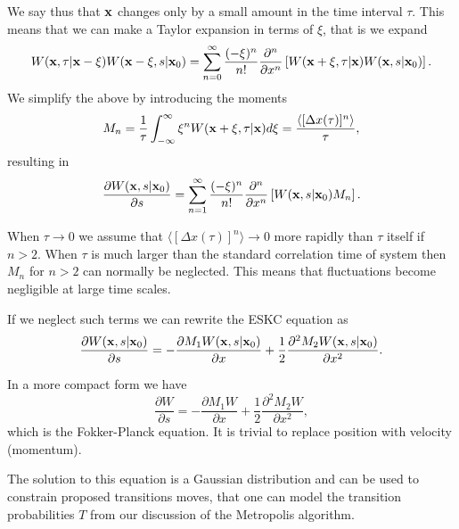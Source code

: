 We say thus that ${\bf x}$ changes only by a small amount in the time interval $\tau$. 
This means that we can make a Taylor expansion in terms of $\xi$, that is we
expand
\[
W({\bf x},\tau|{\bf x}-\xi)W({\bf x}-\xi,s|{\bf x}_0) =
\sum_{n=0}^{\infty}\frac{(-\xi)^n}{n!}\frac{\partial^n}{\partial x^n}\left[W({\bf x}+\xi,\tau|{\bf x})W({\bf x},s|{\bf x}_0)
\right].
\]
We simplify the above by introducing the moments 
\[
M_n=\frac{1}{\tau}\int_{-\infty}^{\infty} \xi^nW({\bf x}+\xi,\tau|{\bf x})d\xi=
\frac{\langle [\Delta x(\tau)]^n\rangle}{\tau},
\]
resulting in
\[
\frac{\partial W({\bf x},s|{\bf x}_0)}{\partial s}=
\sum_{n=1}^{\infty}\frac{(-\xi)^n}{n!}\frac{\partial^n}{\partial x^n}
\left[W({\bf x},s|{\bf x}_0)M_n\right].
\]

When $\tau \rightarrow 0$ we assume that $\langle [\Delta x(\tau)]^n\rangle \rightarrow 0$ more rapidly than $\tau$ itself if $n > 2$. 
When $\tau$ is much larger than the standard correlation time of 
system then $M_n$ for $n > 2$ can normally be neglected.
This means that fluctuations become negligible at large time scales.

If we neglect such terms we can rewrite the ESKC equation as 
\[
\frac{\partial W({\bf x},s|{\bf x}_0)}{\partial s}=
-\frac{\partial M_1W({\bf x},s|{\bf x}_0)}{\partial x}+
\frac{1}{2}\frac{\partial^2 M_2W({\bf x},s|{\bf x}_0)}{\partial x^2}.
\]

In a more compact form we have
\[
\frac{\partial W}{\partial s}=
-\frac{\partial M_1W}{\partial x}+
\frac{1}{2}\frac{\partial^2 M_2W}{\partial x^2},
\]
which is the Fokker-Planck equation.  It is trivial to replace 
position with velocity (momentum).

The solution to this equation is a Gaussian distribution and can be used to constrain proposed transitions moves, that one can model the transition probabilities $T$ from our discussion of the Metropolis algorithm.
